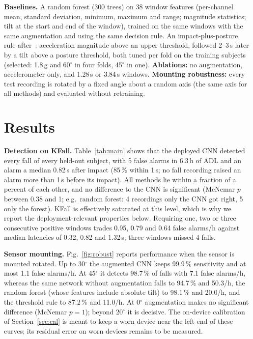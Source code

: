 \documentclass[conference]{IEEEtran}
\begin{document}
\textbf{Baselines.} A random forest (300 trees) on 38 window features (per-channel mean,
standard deviation, minimum, maximum and range; magnitude statistics; tilt at the start
and end of the window), trained on the same windows with the same augmentation and using
the same decision rule. An impact-plus-posture rule after~\cite{bourke2007threshold}:
acceleration magnitude above an upper threshold, followed 2--3\,s later by a tilt above a
posture threshold, both tuned per fold on the training subjects (selected: 1.8\,g and
60$^\circ$ in four folds, 45$^\circ$ in one). \textbf{Ablations:} no augmentation,
accelerometer only, and 1.28\,s or 3.84\,s windows. \textbf{Mounting robustness:} every
test recording is rotated by a fixed angle about a random axis (the same axis for all
methods) and evaluated without retraining.

\section{Results}


\textbf{Detection on KFall.} Table~\ref{tab:main} shows that the deployed CNN detected
every fall of every held-out subject, with 5 false alarms in 6.3\,h of ADL and an alarm a
median 0.82\,s after impact (85\,\% within 1\,s; no fall recording raised an alarm
more than 1\,s before its impact). All methods lie within a fraction of a percent of each other, and no difference
to the CNN is significant (McNemar $p$ between 0.38 and 1; e.g.\ random forest: 4
recordings only the CNN got right, 5 only the forest). KFall is effectively saturated at
this level, which is why we report the deployment-relevant properties below. Requiring
one, two or three consecutive positive windows trades 0.95, 0.79 and 0.64 false alarms/h
against median latencies of 0.32, 0.82 and 1.32\,s; three windows missed 4 falls.

\textbf{Sensor mounting.} Fig.~\ref{fig:robust} reports performance when the sensor is
mounted rotated. Up to 30$^\circ$ the augmented CNN keeps 99.9\,\% sensitivity and at most
1.1 false alarms/h. At 45$^\circ$ it detects 98.7\,\% of falls with 7.1 false alarms/h,
whereas the same network without augmentation falls to 94.7\,\% and 50.3/h, the random
forest (whose features include absolute tilt) to 98.1\,\% and 20.0/h, and the threshold
rule to 87.2\,\% and 11.0/h. At 0$^\circ$ augmentation makes no significant difference (McNemar $p = 1$); beyond
20$^\circ$ it is decisive. The on-device calibration of Section~\ref{sec:cal} is meant to
keep a worn device near the left end of these curves; its residual error on worn devices
remains to be measured.
\end{document}
